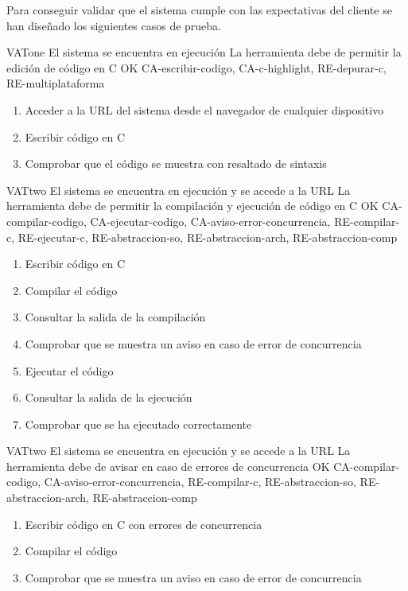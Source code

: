 Para conseguir validar que el sistema cumple con las expectativas del cliente se han diseñado los siguientes casos de prueba.

\begin{testCase}{VAT}{one}
    {El sistema se encuentra en ejecución}
    {\NA}
    {La herramienta debe de permitir la edición de código en C}
    {OK}
    {CA-escribir-codigo, CA-c-highlight, RE-depurar-c, RE-multiplataforma}
    \begin{enumerate}
        \item Acceder a la URL del sistema desde el navegador de cualquier dispositivo
        \item Escribir código en C
        \item Comprobar que el código se muestra con resaltado de sintaxis
    \end{enumerate}
\end{testCase}

\begin{testCase}{VAT}{two}
    {El sistema se encuentra en ejecución y se accede a la URL}
    {\NA}
    {La herramienta debe de permitir la compilación y ejecución de código en C}
    {OK}
    {CA-compilar-codigo, CA-ejecutar-codigo, CA-aviso-error-concurrencia, RE-compilar-c, RE-ejecutar-c, RE-abstraccion-so, RE-abstraccion-arch, RE-abstraccion-comp}
    \begin{enumerate}
        \item Escribir código en C
        \item Compilar el código
        \item Consultar la salida de la compilación
        \item Comprobar que se muestra un aviso en caso de error de concurrencia
        \item Ejecutar el código
        \item Consultar la salida de la ejecución
        \item Comprobar que se ha ejecutado correctamente
    \end{enumerate}
\end{testCase}

\begin{testCase}{VAT}{two}
    {El sistema se encuentra en ejecución y se accede a la URL}
    {\NA}
    {La herramienta debe de avisar en caso de errores de concurrencia}
    {OK}
    {CA-compilar-codigo, CA-aviso-error-concurrencia, RE-compilar-c, RE-abstraccion-so, RE-abstraccion-arch, RE-abstraccion-comp}
    \begin{enumerate}
        \item Escribir código en C con errores de concurrencia
        \item Compilar el código
        \item Comprobar que se muestra un aviso en caso de error de concurrencia
    \end{enumerate}
\end{testCase}

